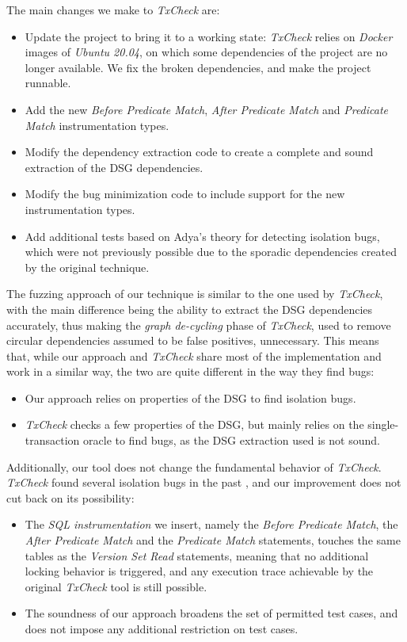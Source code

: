 The main changes we make to \textit{TxCheck} are:
\begin{itemize}
    \item Update the project to bring it to a working state: \textit{TxCheck} relies on \textit{Docker} images of \textit{Ubuntu 20.04}, on which some dependencies of the project are no longer available. We fix the broken dependencies, and make the project runnable.
    \item Add the new \textit{Before Predicate Match}, \textit{After Predicate Match} and \textit{Predicate Match} instrumentation types.
    \item Modify the dependency extraction code to create a complete and sound extraction of the DSG dependencies.
    \item Modify the bug minimization code to include support for the new instrumentation types.
    \item Add additional tests based on Adya's theory \cite{adya1999weak} for detecting isolation bugs, which were not previously possible due to the sporadic dependencies created by the original technique.
\end{itemize}

The fuzzing approach of our technique is similar to the one used by \textit{TxCheck}, with the main difference being the ability to extract the DSG dependencies accurately, thus making the \textit{graph de-cycling} phase of \textit{TxCheck}, used to remove circular dependencies assumed to be false positives, unnecessary. This means that, while our approach and \textit{TxCheck} share most of the implementation and work in a similar way, the two are quite different in the way they find bugs:
\begin{itemize}
    \item Our approach relies on properties of the DSG to find isolation bugs.
    \item \textit{TxCheck} checks a few properties of the DSG, but mainly relies on the single-transaction oracle to find bugs, as the DSG extraction used is not sound.
\end{itemize}

Additionally, our tool does not change the fundamental behavior of \textit{TxCheck}. \textit{TxCheck} found several isolation bugs in the past \cite{jiang2023detecting}, and our improvement does not cut back on its possibility:
\begin{itemize}
    \item The \textit{SQL instrumentation} we insert, namely the \textit{Before Predicate Match}, the \textit{After Predicate Match} and the \textit{Predicate Match} statements, touches the same tables as the \textit{Version Set Read} statements, meaning that no additional locking behavior is triggered, and any execution trace achievable by the original \textit{TxCheck} tool is still possible.
    \item The soundness of our approach broadens the set of permitted test cases, and does not impose any additional restriction on test cases.
\end{itemize}

